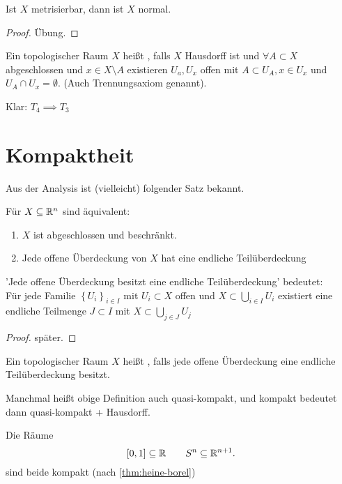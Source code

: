 \begin{theorem}\label{thm:metrischer-raum-ist-normal}
    Ist $X$ metrisierbar, dann ist  $X$ normal.
\end{theorem}

\begin{proof}
    Übung.
\end{proof}

\begin{definition}[Regulär]\label{def:regulär}
    Ein topologischer Raum $X$ heißt  , falls $X$ Hausdorff ist und  $\forall  A \subset X$ abgeschlossen und $x\in X \setminus A$ existieren $U_a, U_{x}$ offen mit $A\subset U_A, x\in U_x$ und $U_A \cap U_x = \emptyset$. (Auch Trennungsaxiom  genannt).
\end{definition}

Klar: $T_4 \implies T_3$


\section{Kompaktheit}
Aus der Analysis ist (vielleicht) folgender Satz bekannt.
\begin{theorem}\label{thm:heine-borel}
    Für $X\subseteq \mathbb{R}^n$ sind äquivalent:
    \begin{enumerate}[1)]
        \item $X$ ist abgeschlossen und beschränkt.
        \item Jede offene Überdeckung von $X$ hat eine endliche Teilüberdeckung
    \end{enumerate}
\end{theorem}

\begin{recap}
    'Jede offene Überdeckung besitzt eine endliche Teilüberdeckung' bedeutet: \\
    Für jede Familie $\left \{U_i\right\} _{i \in I}$ mit $U_i \subset X$ offen und $X \subset \bigcup_{i \in I}U_i$ existiert eine endliche Teilmenge $J\subset I$ mit $X \subset \bigcup_{j\in J} U_j$
\end{recap}
\begin{proof}
    später.
\end{proof}

\begin{definition}[Kompaktheit]\label{def:kompakt}
    Ein topologischer Raum $X$ heißt  , falls jede offene Überdeckung eine endliche Teilüberdeckung besitzt.
\end{definition}
\begin{remark}
    Manchmal heißt obige Definition auch quasi-kompakt, und kompakt bedeutet dann quasi-kompakt + Hausdorff.
\end{remark}

\begin{example}
   Die Räume
   \[
       [0,1] \subseteq \mathbb{R} \qquad S^n \subseteq \mathbb{R}^{n+1}
   .\] 
   sind beide kompakt (nach \ref{thm:heine-borel})
\end{example}
